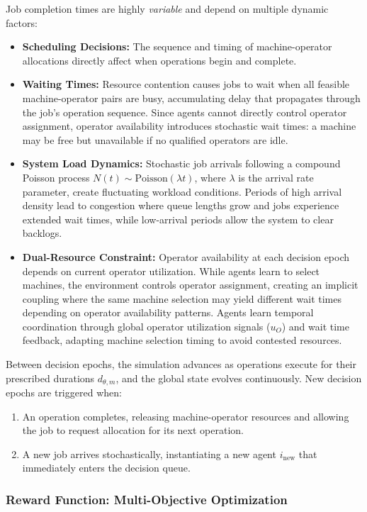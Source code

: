 Job completion times are highly \textit{variable} and depend on multiple dynamic factors:
\begin{itemize}
    \item \textbf{Scheduling Decisions:} The sequence and timing of machine-operator allocations directly affect when operations begin and complete.
    \item \textbf{Waiting Times:} Resource contention causes jobs to wait when all feasible machine-operator pairs are busy, accumulating delay that propagates through the job's operation sequence. Since agents cannot directly control operator assignment, operator availability introduces stochastic wait times: a machine may be free but unavailable if no qualified operators are idle.
    \item \textbf{System Load Dynamics:} Stochastic job arrivals following a compound Poisson process \( N(t) \sim \text{Poisson}(\lambda t) \), where \( \lambda \) is the arrival rate parameter, create fluctuating workload conditions. Periods of high arrival density lead to congestion where queue lengths grow and jobs experience extended wait times, while low-arrival periods allow the system to clear backlogs.
    \item \textbf{Dual-Resource Constraint:} Operator availability at each decision epoch depends on current operator utilization. While agents learn to select machines, the environment controls operator assignment, creating an implicit coupling where the same machine selection may yield different wait times depending on operator availability patterns. Agents learn temporal coordination through global operator utilization signals (\( u_O \)) and wait time feedback, adapting machine selection timing to avoid contested resources.
\end{itemize}

Between decision epochs, the simulation advances as operations execute for their prescribed durations \( d_{\theta,m} \), and the global state evolves continuously. New decision epochs are triggered when:
\begin{enumerate}
    \item An operation completes, releasing machine-operator resources and allowing the job to request allocation for its next operation.
    \item A new job arrives stochastically, instantiating a new agent \( i_{\text{new}} \) that immediately enters the decision queue.
\end{enumerate}

\subsubsection{Reward Function: Multi-Objective Optimization}

